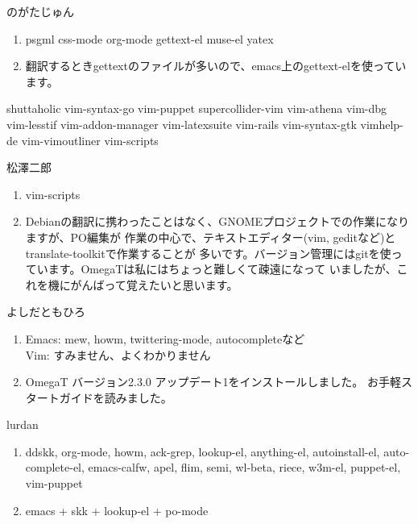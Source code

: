 \documentclass[cjk,dvipdfmx,12pt,%
hyperref={bookmarks=true,bookmarksnumbered=true,bookmarksopen=false,%
colorlinks=false,%
pdftitle={第 52 回 関西 Debian 勉強会},%
pdfauthor={倉敷・のがた・佐々木},%
pdfsubject={資料},%
}]{beamer}
\begin{document}
\begin{frame}{ のがたじゅん }
\begin{enumerate}
\item psgml css-mode org-mode gettext-el muse-el yatex
\item 翻訳するときgettextのファイルが多いので、emacs上のgettext-elを使っています。
\end{enumerate}
\end{frame}

\begin{frame}{ shuttaholic }
vim-syntax-go vim-puppet supercollider-vim vim-athena vim-dbg vim-lesstif vim-addon-manager vim-latexsuite vim-rails vim-syntax-gtk vimhelp-de vim-vimoutliner vim-scripts
\end{frame}

\begin{frame}{ 松澤二郎 }
\begin{enumerate}
\item vim-scripts
\item Debianの翻訳に携わったことはなく、GNOMEプロジェクトでの作業になりますが、PO編集が
作業の中心で、テキストエディター(vim, geditなど)とtranslate-toolkitで作業することが
多いです。バージョン管理にはgitを使っています。OmegaTは私にはちょっと難しくて疎遠になって
いましたが、これを機にがんばって覚えたいと思います。
\end{enumerate}
\end{frame}

\begin{frame}{ よしだともひろ }
\begin{enumerate}
\item Emacs: mew, howm, twittering-mode, autocompleteなど\\
  Vim: すみません、よくわかりません
\item OmegaT バージョン2.3.0 アップデート1をインストールしました。
  お手軽スタートガイドを読みました。
\end{enumerate}
\end{frame}

\begin{frame}{ lurdan }
\begin{enumerate}
\item ddskk, org-mode, howm, ack-grep, lookup-el, anything-el, autoinstall-el, auto-complete-el, emacs-calfw, apel, flim, semi, wl-beta, riece, w3m-el, puppet-el, vim-puppet
\item emacs + skk + lookup-el + po-mode
\end{enumerate}
\end{frame}
\end{document}
